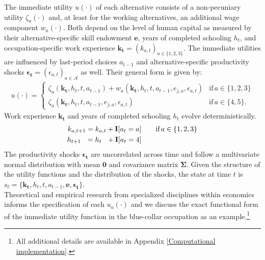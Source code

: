 \noindent The immediate utility $u(\cdot)$ of each alternative consists of a non-pecuniary utility $\zeta_a(\cdot)$ and, at least for the working alternatives, an additional wage component $w_a(\cdot)$. Both depend on the level of human capital as measured by their alternative-specific skill endowment $\bm{e}$, years of completed schooling $h_t$, and occupation-specific work experience $\bm{k_t} = \left(k_{a,t}\right)_{a\in\{1, 2, 3\}}$. The immediate utilities are influenced by last-period choices $a_{t -1}$ and alternative-specific productivity shocks $\bm{\epsilon_t} = \left(\epsilon_{a,t}\right)_{a\in\mathcal{A}}$ as well. Their general form is given by:
%
\begin{align*}
u(\cdot) =
\begin{cases}
    \zeta_a(\bm{k_t}, h_t, t, a_{t -1})  + w_a(\bm{k_t}, h_t, t, a_{t -1}, e_{j, a}, \epsilon_{a,t})                & \text{if}\, a \in \{1, 2, 3\}  \\
    \zeta_a(\bm{k_t}, h_t, t, a_{t-1}, e_{j,a}, \epsilon_{a,t})                                                  &  \text{if}\, a \in \{4, 5\}.
\end{cases}
\end{align*}
%
\noindent Work experience $\bm{k_t}$  and years of completed schooling $h_t$ evolve deterministically.
%
\begin{align*}
k_{a,t+1} = k_{a,t} + {\textbf{I}}[a_t = a]  &\qquad \text{if}\, a \in \{1, 2, 3\} \\
h_{t + 1\phantom{,a}} = h_{t\phantom{,a}} +   {\textbf{I}}[a_t = 4]  &\qquad
\end{align*}
%
\noindent The productivity shocks $\bm{\epsilon_t}$ are uncorrelated across time and follow a multivariate normal distribution with mean $\bm{0}$ and covariance matrix $\bm{\Sigma}$. Given the structure of the utility functions and the distribution of the shocks, the state at time $t$ is $s_t = \{\bm{k_t}, h_t, t, a_{t -1}, \bm{e},\bm{\epsilon_t}\}$.\\

\noindent Theoretical and empirical research from specialized disciplines within economics informs the specification of each $u_a(\cdot)$ and we discuss the exact functional form of the immediate utility function in the blue-collar occupation as an example.\footnote{All additional details are available in Appendix \ref{Computational implementation}.}\\


